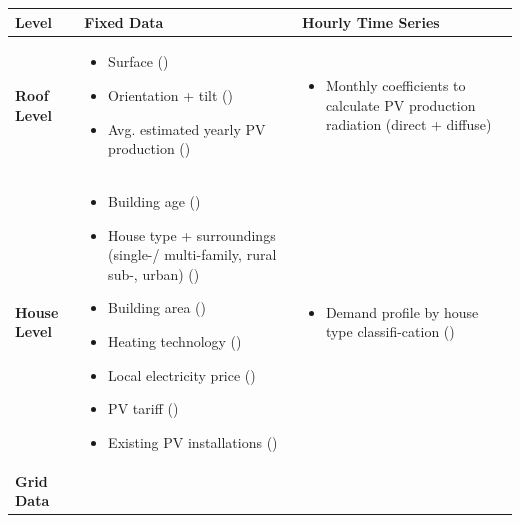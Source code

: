 \documentclass[12PT, ]{article}
\begin{document}
\begin{table}[bth]
    \centering
    \footnotesize
    \begin{tabularx}{\linewidth}{|l X X|}
    \hline
    \textbf{Level} & \textbf{Fixed Data} & \textbf{Hourly Time Series} \\
    \hline
    \textbf{Roof Level} & 
    \begin{itemize}[nosep,leftmargin=0.8em]
      \item Surface (\cite{solkat2023})
      \item Orientation + tilt (\cite{solkat2023})
      \item Avg. estimated yearly PV production (\cite{solkat2023})
    \end{itemize} & 
    \begin{itemize}[nosep,leftmargin=0.8em]
      \item Monthly coefficients to calculate PV production radiation (direct + diffuse)
    \end{itemize} 
    \\
    \hline
    \textbf{House Level} & 
    \begin{itemize}[nosep,leftmargin=0.8em]
      \item Building age (\cite{gwr2025})
      \item House type + surroundings (single-/ multi-family, rural sub-, urban) (\cite{gwr2025})
      \item Building area (\cite{gwr2025})
      \item Heating technology (\cite{gwr2025})
      \item Local electricity price (\cite{elcom2023})
      \item PV tariff (\cite{vese_pvtarif2023})
      \item Existing PV installations (\cite{elec_prod2024})
    \end{itemize} &
    \begin{itemize}[nosep,leftmargin=0.8em]
      \item Demand profile by house type classifi-cation (\cite{swissstore2022})
    \end{itemize} 
    \\
    \hline
    \textbf{Grid Data} & 
    \begin{itemize}[nosep,leftmargin=0.8em]

\end{itemize}
\end{tabularx}
\end{table}
\end{document}
